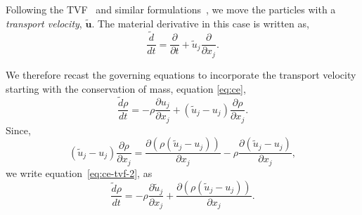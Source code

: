 \documentclass[preprint,12pt]{elsarticle}
\newcommand{\ten}[1]{\ensuremath{\mathbf{#1}}}
\begin{document}
Following the TVF~\cite{Adami2013} and similar
formulations~\cite{oger_ale_sph_2016}, we move the particles with a
\emph{transport velocity}, $\tilde{\ten{u}}$. The material derivative in this
case is written as,
\begin{equation}
  \label{eq:modified-material-derivative}
  \frac{\tilde{d} }{d t} = \frac{\partial }{\partial t} +
  \tilde{u}_j \frac{\partial }{\partial x_j}.
\end{equation}

We therefore recast the governing equations to incorporate the transport
velocity starting with the conservation of mass, equation \eqref{eq:ce},
\begin{equation}
  \label{eq:ce-tvf-2}
  \frac{\tilde{d} \rho}{d t} = - \rho \frac{\partial u_j}{\partial x_j}+
  (\tilde{u}_j - u_j) \frac{\partial \rho} {\partial x_j}.
\end{equation}
Since,
\begin{equation}
  \label{eq:tmp:div-vv}
  (\tilde{u}_j - u_j)  \frac{\partial \rho}{\partial x_j} =
  \frac{\partial (\rho (\tilde{u}_j - u_j))}{\partial x_j} -
  \rho \frac{\partial (\tilde{u}_j - u_j)}{\partial x_j},
\end{equation}
we write equation~\eqref{eq:ce-tvf-2}, as
\begin{equation}
  \label{eq:ce-tvf}
  \frac{\tilde{d} \rho}{d t} =
  - \rho \frac{\partial \tilde{u}_j}{\partial x_j} +
  \frac{\partial (\rho (\tilde{u}_j - u_j))}{\partial x_j}.
\end{equation}
\end{document}
